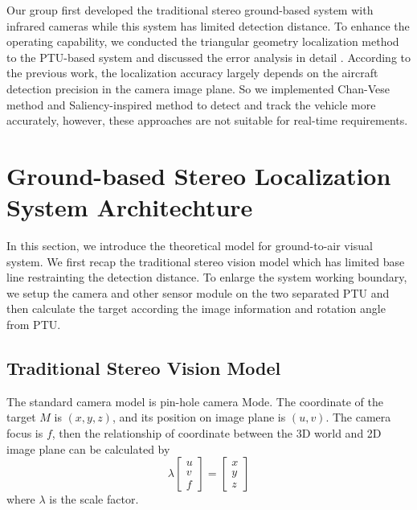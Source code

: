 Our group first developed the traditional stereo ground-based system with infrared cameras \cite{kong2013autonomous} while this system has limited detection distance. To enhance the operating capability, we conducted the triangular geometry localization method to the PTU-based system and discussed the error analysis in detail \cite{kong2014ground}. According to the previous work, the localization accuracy largely depends on the aircraft detection precision in the camera image plane. So we implemented Chan-Vese method \cite{tang2016ground} and Saliency-inspired method \cite{ma2016stereo} to detect and track the vehicle more accurately, however, these approaches are not suitable for real-time requirements.

\section{Ground-based Stereo Localization System Architechture}
In this section, we introduce the theoretical model for ground-to-air visual system. We first recap the traditional stereo vision model which has limited base line restrainting the detection distance. To enlarge the system working boundary, we setup the camera and other sensor module on the two separated PTU and then calculate the target according the image information and rotation angle from PTU.

\subsection{Traditional Stereo Vision Model}
The standard camera model is pin-hole camera Mode. The coordinate of the target $M$ is $(x,y,z)$, and its position on image plane is $(u,v)$. The camera focus is $f$, then the relationship of coordinate between the 3D world and 2D image plane can be calculated by 
\begin{equation}
\lambda\left[ {\begin{array}{*{20}{c}}
	u \\ 
	v \\ 
	f 
	\end{array}} \right] =\left[ {\begin{array}{*{20}{c}}
	x \\ 
	y \\ 
	z 
	\end{array}} \right]
\end{equation}
where $\lambda$ is the scale factor. 

